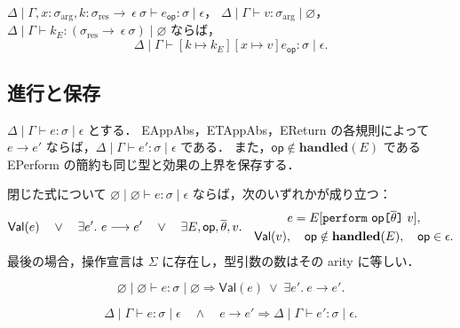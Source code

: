 \begin{lemma}[操作節の項置換]
\label{lem:fxi-operation-substitution}
$\Delta\mid\Gamma,x:\sigma_{\mathrm{arg}},
 k:\sigma_{\mathrm{res}}\rightarrow~\epsilon~\sigma
 \vdash e_{\mathsf{op}}:\sigma\mid\epsilon$，
$\Delta\mid\Gamma\vdash v:\sigma_{\mathrm{arg}}\mid\varnothing$，
$\Delta\mid\Gamma\vdash k_E:
 (\sigma_{\mathrm{res}}\rightarrow~\epsilon~\sigma)
 \mid\varnothing$ ならば，
\[
  \Delta\mid\Gamma\vdash
    [k\mapsto k_E][x\mapsto v]e_{\mathsf{op}}:
    \sigma\mid\epsilon.
\]
\end{lemma}

\subsection{進行と保存}

\begin{proposition}[基本簡約の型保存]
\label{prop:fxi-redex-preservation}
$\Delta\mid\Gamma\vdash e:\sigma\mid\epsilon$ とする．
EAppAbs，ETAppAbs，EReturn の各規則によって $e\longrightarrow e'$
ならば，$\Delta\mid\Gamma\vdash e':\sigma\mid\epsilon$ である．
また，$\mathsf{op}\notin\mathbf{handled}(E)$ である
EPerform の簡約も同じ型と効果の上界を保存する．
\end{proposition}

\begin{theorem}[Progress]
\label{thm:fxi-progress}
閉じた式について
$\varnothing\mid\varnothing\vdash e:\sigma\mid\epsilon$
ならば，次のいずれかが成り立つ：
\[
  \mathsf{Val}(e)
  \quad\lor\quad
  \exists e'.\ e\longrightarrow e'
  \quad\lor\quad
  \exists E,\mathsf{op},\overline{\theta},v.\quad
    \begin{gathered}
      e=E[\texttt{perform}~\mathsf{op}
          \texttt{[} \overline{\theta} \texttt{]}~v],\\
      \mathsf{Val}(v),\quad
      \mathsf{op}\notin\mathbf{handled}(E),\quad
      \mathsf{op}\in\epsilon.
    \end{gathered}
\]
最後の場合，操作宣言は $\Sigma$ に存在し，型引数の数はその arity に等しい．
\end{theorem}

\begin{proposition}
\label{prop:fxi-empty-progress}
\[
  \varnothing\mid\varnothing\vdash
    e:\sigma\mid\varnothing
  \Longrightarrow
  \mathsf{Val}(e)
  \ \lor\;
  \exists e'.\ e\longrightarrow e'.
\]
\end{proposition}

\begin{theorem}[Preservation]
\label{thm:fxi-preservation}
\[
  \Delta\mid\Gamma\vdash e:\sigma\mid\epsilon
  \quad\land\quad
  e\longrightarrow e'
  \Longrightarrow
  \Delta\mid\Gamma\vdash e':\sigma\mid\epsilon.
\]
\end{theorem}

